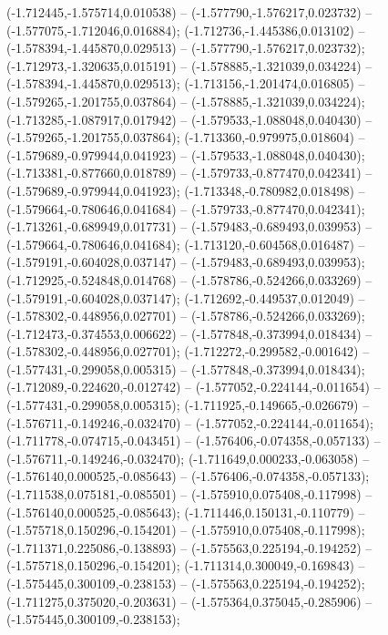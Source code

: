  (-1.712445,-1.575714,0.010538) -- (-1.577790,-1.576217,0.023732) -- (-1.577075,-1.712046,0.016884);
 (-1.712736,-1.445386,0.013102) -- (-1.578394,-1.445870,0.029513) -- (-1.577790,-1.576217,0.023732);
 (-1.712973,-1.320635,0.015191) -- (-1.578885,-1.321039,0.034224) -- (-1.578394,-1.445870,0.029513);
 (-1.713156,-1.201474,0.016805) -- (-1.579265,-1.201755,0.037864) -- (-1.578885,-1.321039,0.034224);
 (-1.713285,-1.087917,0.017942) -- (-1.579533,-1.088048,0.040430) -- (-1.579265,-1.201755,0.037864);
 (-1.713360,-0.979975,0.018604) -- (-1.579689,-0.979944,0.041923) -- (-1.579533,-1.088048,0.040430);
 (-1.713381,-0.877660,0.018789) -- (-1.579733,-0.877470,0.042341) -- (-1.579689,-0.979944,0.041923);
 (-1.713348,-0.780982,0.018498) -- (-1.579664,-0.780646,0.041684) -- (-1.579733,-0.877470,0.042341);
 (-1.713261,-0.689949,0.017731) -- (-1.579483,-0.689493,0.039953) -- (-1.579664,-0.780646,0.041684);
 (-1.713120,-0.604568,0.016487) -- (-1.579191,-0.604028,0.037147) -- (-1.579483,-0.689493,0.039953);
 (-1.712925,-0.524848,0.014768) -- (-1.578786,-0.524266,0.033269) -- (-1.579191,-0.604028,0.037147);
 (-1.712692,-0.449537,0.012049) -- (-1.578302,-0.448956,0.027701) -- (-1.578786,-0.524266,0.033269);
 (-1.712473,-0.374553,0.006622) -- (-1.577848,-0.373994,0.018434) -- (-1.578302,-0.448956,0.027701);
 (-1.712272,-0.299582,-0.001642) -- (-1.577431,-0.299058,0.005315) -- (-1.577848,-0.373994,0.018434);
 (-1.712089,-0.224620,-0.012742) -- (-1.577052,-0.224144,-0.011654) -- (-1.577431,-0.299058,0.005315);
 (-1.711925,-0.149665,-0.026679) -- (-1.576711,-0.149246,-0.032470) -- (-1.577052,-0.224144,-0.011654);
 (-1.711778,-0.074715,-0.043451) -- (-1.576406,-0.074358,-0.057133) -- (-1.576711,-0.149246,-0.032470);
 (-1.711649,0.000233,-0.063058) -- (-1.576140,0.000525,-0.085643) -- (-1.576406,-0.074358,-0.057133);
 (-1.711538,0.075181,-0.085501) -- (-1.575910,0.075408,-0.117998) -- (-1.576140,0.000525,-0.085643);
 (-1.711446,0.150131,-0.110779) -- (-1.575718,0.150296,-0.154201) -- (-1.575910,0.075408,-0.117998);
 (-1.711371,0.225086,-0.138893) -- (-1.575563,0.225194,-0.194252) -- (-1.575718,0.150296,-0.154201);
 (-1.711314,0.300049,-0.169843) -- (-1.575445,0.300109,-0.238153) -- (-1.575563,0.225194,-0.194252);
 (-1.711275,0.375020,-0.203631) -- (-1.575364,0.375045,-0.285906) -- (-1.575445,0.300109,-0.238153);
